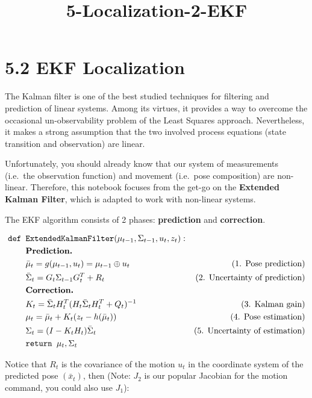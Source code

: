 \documentclass[11pt]{article}
\title{5-Localization-2-EKF}
\begin{document}
    
    \maketitle
    
    

    
    \hypertarget{ekf-localization}{%
\section{5.2 EKF Localization}\label{ekf-localization}}

The Kalman filter is one of the best studied techniques for filtering
and prediction of linear systems. Among its virtues, it provides a way
to overcome the occasional un-observability problem of the Least Squares
approach. Nevertheless, it makes a strong assumption that the two
involved process equations (state transition and observation) are
linear.

Unfortunately, you should already know that our system of measurements
(i.e.~the observation function) and movement (i.e.~pose composition) are
non-linear. Therefore, this notebook focuses from the get-go on the
\textbf{Extended Kalman Filter}, which is adapted to work with
non-linear systems.

The EKF algorithm consists of 2 phases: \textbf{prediction} and
\textbf{correction}.

\[
  \begin{aligned}
      \verb!def !& \verb!ExtendedKalmanFilter!(\mu_{t-1},\Sigma_{t-1}, u_t, z_t): \\
      & \textbf{Prediction.} \\
      & \bar\mu_t = g(\mu_{t-1}, u_t) = \mu_{t-1} \oplus u_t &\text{(1. Pose prediction)}\\
      & \bar\Sigma_t = G_t \Sigma_{t-1} G_t^T + R_t &\text{(2. Uncertainty of prediction)}\\
      & \textbf{Correction.} \\
      & K_t = \bar\Sigma_t H^T_t (H_t \bar\Sigma_t H^T_t + Q_t)^{-1} &\text{(3. Kalman gain)}\\
      & \mu_t = \bar\mu_t + K_t (z_t - h(\bar\mu_t)) &\text{(4. Pose estimation)}\\
      & \Sigma_t = (I - K_t H_t) \bar\Sigma_t &\text{(5. Uncertainty of estimation)}\\
      & \verb!return ! \mu_t, \Sigma_t
  \end{aligned}
\]

Notice that \(R_t\) is the covariance of the motion \(u_t\) in the
coordinate system of the predicted pose \((\bar x_t)\), then (Note:
\(J_2\) is our popular Jacobian for the motion command, you could also
use \(J_1\)):
\end{document}
